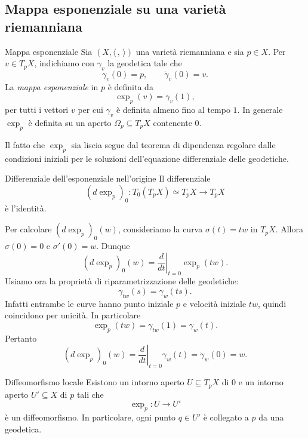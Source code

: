 \documentclass[a4paper]{article}
\begin{document}
\subsection{Mappa esponenziale su una varietà riemanniana}

\begin{snippetdefinition}{Mappa esponenziale}
Sia \((X,\langle\,,\,\rangle)\) una varietà riemanniana e sia \(p\in X\). Per \(v\in T_pX\), indichiamo con \(\gamma_v\) la geodetica tale che
\[
    \gamma_v(0)=p, \qquad \dot\gamma_v(0)=v.
\]
La \emph{mappa esponenziale} in \(p\) è definita da
\[
    \exp_p(v)=\gamma_v(1),
\]
per tutti i vettori \(v\) per cui \(\gamma_v\) è definita almeno fino al tempo \(1\). In generale \(\exp_p\) è definita su un aperto \(\Omega_p\subseteq T_pX\) contenente \(0\).
\end{snippetdefinition}

Il fatto che \(\exp_p\) sia liscia segue dal teorema di dipendenza regolare dalle condizioni iniziali per le soluzioni dell'equazione differenziale delle geodetiche.

\begin{snippetproposition}{Differenziale dell'esponenziale nell'origine}
Il differenziale
\[
    (d\exp_p)_0\colon T_0(T_pX)\simeq T_pX\longrightarrow T_pX
\]
è l'identità.
\end{snippetproposition}

\begin{snippetproof}{}
Per calcolare \((d\exp_p)_0(w)\), consideriamo la curva \(\sigma(t)=tw\) in \(T_pX\). Allora \(\sigma(0)=0\) e \(\sigma'(0)=w\). Dunque
\[
    (d\exp_p)_0(w)
    =\left.\frac{d}{dt}\right|_{t=0}\exp_p(tw).
\]
Usiamo ora la proprietà di riparametrizzazione delle geodetiche:
\[
    \gamma_{tw}(s)=\gamma_w(ts).
\]
Infatti entrambe le curve hanno punto iniziale \(p\) e velocità iniziale \(tw\), quindi coincidono per unicità. In particolare
\[
    \exp_p(tw)=\gamma_{tw}(1)=\gamma_w(t).
\]
Pertanto
\[
    (d\exp_p)_0(w)
    =\left.\frac{d}{dt}\right|_{t=0}\gamma_w(t)
    =\dot\gamma_w(0)
    =w.
\]
\end{snippetproof}

\begin{snippetcorollary}{Diffeomorfismo locale}
Esistono un intorno aperto \(U\subseteq T_pX\) di \(0\) e un intorno aperto \(U'\subseteq X\) di \(p\) tali che
\[
    \exp_p\colon U\longrightarrow U'
\]
è un diffeomorfismo. In particolare, ogni punto \(q\in U'\) è collegato a \(p\) da una geodetica.
\end{snippetcorollary}
\end{document}
